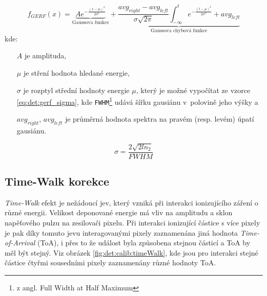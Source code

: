 \begin{equation}\label{eq:det:gerf}
	f_{GERF}(x) = \underbrace{Ae^{ -\frac{(x-\mu)^2}{2\sigma^2} }}_{\text{Gaussova funkce}} +
	\underbrace{ \frac{avg_{right} - avg_{left}}{\sigma\sqrt{2\pi}} \int_{-\infty}^t e^{ -\frac{(t-\mu)^2}{2\sigma^2} } + avg_{left}}_{\text{Gaussova chybová funkce}}
\end{equation}
kde:
\begin{changemargin}{1.5cm}{1cm} 
	\begin{itemize}
		\item [$A$] je amplituda,
		\item [$\mu$] je stření hodnota hledané energie,
		\item [$\sigma$] je rozptyl střední hodnoty energie $\mu$, který je možné vypočítat ze vzorce 
			\ref{eq:det:gerf_sigma}, kde \texttt{FWHM}\footnote{z angl. Full Width at Half Maximum} udává šířku gausiánu v~polovině jeho výšky a
		\item [$avg_{right}$, $avg_{left}$] je průměrná hodnota spektra na pravém (resp. levém) úpatí gausiánu.
	\end{itemize}
\end{changemargin}

\begin{equation}\label{eq:det:gerf_sigma}
	\sigma = \frac{2\sqrt{2ln_2}}{FWHM}
\end{equation}

\subsection{Time-Walk korekce}\label{chap:detectors:calibration:timeWalk}

\textit{Time-Walk} efekt je nežádoucí jev, který vzniká při interakci ionizujícího záření o různé energii. Velikost deponované energie má vliv na amplitudu a sklon napěťového pulzu na zesilovači pixelu. Při interakci ionizující částice s více pixely je pak díky tomuto jevu interagovanými pixely zaznamenána jiná hodnota \textit{Time-of-Arrival} (ToA), i přes to že událost byla způsobena stejnou částicí a ToA by měl být stejný. Viz obrázek \ref{fig:det:calib:timeWalk}, kde jsou pro interakci stejné částice čtyřmi sousedními pixely zaznamenány různé hodnoty ToA. 

